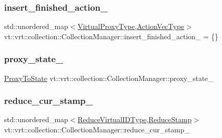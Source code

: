 \subsubsection{\texorpdfstring{insert\+\_\+finished\+\_\+action\+\_\+}{insert\_finished\_action\_}}
{\footnotesize\ttfamily std\+::unordered\+\_\+map$<$\hyperlink{namespacevt_a1b417dd5d684f045bb58a0ede70045ac}{Virtual\+Proxy\+Type},\hyperlink{structvt_1_1vrt_1_1collection_1_1_collection_manager_a51650235f0e53ae08381942eba822679}{Action\+Vec\+Type}$>$ vt\+::vrt\+::collection\+::\+Collection\+Manager\+::insert\+\_\+finished\+\_\+action\+\_\+ = \{\}\hspace{0.3cm}{\ttfamily [private]}}

\mbox{\label{structvt_1_1vrt_1_1collection_1_1_collection_manager_a5bafa0103098ee13e3b3653431e2657d}} 
\subsubsection{\texorpdfstring{proxy\+\_\+state\+\_\+}{proxy\_state\_}}
{\footnotesize\ttfamily \hyperlink{structvt_1_1vrt_1_1collection_1_1_collection_manager_a47acf9cd5a988ba197fbef5097f75dde}{Proxy\+To\+State} vt\+::vrt\+::collection\+::\+Collection\+Manager\+::proxy\+\_\+state\+\_\+\hspace{0.3cm}{\ttfamily [private]}}

\mbox{\label{structvt_1_1vrt_1_1collection_1_1_collection_manager_a5bf3bcab36addad323a03746928dfac8}} 
\subsubsection{\texorpdfstring{reduce\+\_\+cur\+\_\+stamp\+\_\+}{reduce\_cur\_stamp\_}}
{\footnotesize\ttfamily std\+::unordered\+\_\+map$<$\hyperlink{structvt_1_1vrt_1_1collection_1_1_collection_manager_ae820c8c22ae8c7350fa0232e0749b097}{Reduce\+Virtual\+I\+D\+Type},\hyperlink{structvt_1_1vrt_1_1collection_1_1_collection_manager_ae8aac19e0ae07e9225142e5880eac830}{Reduce\+Stamp}$>$ vt\+::vrt\+::collection\+::\+Collection\+Manager\+::reduce\+\_\+cur\+\_\+stamp\+\_\+\hspace{0.3cm}{\ttfamily [private]}}

